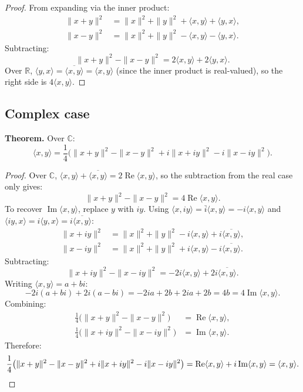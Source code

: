 \documentclass[12pt]{article}
\begin{document}
\begin{proof}
From expanding via the inner product:
\begin{align*}
\|x+y\|^2 &= \|x\|^2 + \|y\|^2 + \langle x,y\rangle + \langle y,x\rangle, \\
\|x-y\|^2 &= \|x\|^2 + \|y\|^2 - \langle x,y\rangle - \langle y,x\rangle.
\end{align*}
Subtracting:
\[
\|x+y\|^2 - \|x-y\|^2 = 2\langle x,y\rangle + 2\langle y,x\rangle.
\]
Over $\mathbb{R}$, $\langle y,x\rangle = \overline{\langle x,y\rangle} = \langle x,y\rangle$ (since the inner product is real-valued), so the right side is $4\langle x,y\rangle$.
\end{proof}

\subsection{Complex case}

\textbf{Theorem.} Over $\mathbb{C}$:
\[
\langle x,y\rangle = \frac{1}{4}\bigl(\|x+y\|^2 - \|x-y\|^2 + i\|x+iy\|^2 - i\|x-iy\|^2\bigr).
\]

\begin{proof}
Over $\mathbb{C}$, $\langle x,y\rangle + \overline{\langle x,y\rangle} = 2\operatorname{Re}\langle x,y\rangle$, so the subtraction from the real case only gives:
\[
\|x+y\|^2 - \|x-y\|^2 = 4\operatorname{Re}\langle x,y\rangle.
\]
To recover $\operatorname{Im}\langle x,y\rangle$, replace $y$ with $iy$. Using $\langle x, iy\rangle = \bar{i}\langle x,y\rangle = -i\langle x,y\rangle$ and $\langle iy, x\rangle = i\langle y,x\rangle = i\overline{\langle x,y\rangle}$:
\begin{align*}
\|x+iy\|^2 &= \|x\|^2 + \|y\|^2 - i\langle x,y\rangle + i\overline{\langle x,y\rangle}, \\
\|x-iy\|^2 &= \|x\|^2 + \|y\|^2 + i\langle x,y\rangle - i\overline{\langle x,y\rangle}.
\end{align*}
Subtracting:
\[
\|x+iy\|^2 - \|x-iy\|^2 = -2i\langle x,y\rangle + 2i\overline{\langle x,y\rangle}.
\]
Writing $\langle x,y\rangle = a+bi$:
\[
-2i(a+bi) + 2i(a-bi) = -2ia + 2b + 2ia + 2b = 4b = 4\operatorname{Im}\langle x,y\rangle.
\]
Combining:
\begin{align*}
\tfrac{1}{4}\bigl(\|x+y\|^2 - \|x-y\|^2\bigr) &= \operatorname{Re}\langle x,y\rangle, \\
\tfrac{1}{4}\bigl(\|x+iy\|^2 - \|x-iy\|^2\bigr) &= \operatorname{Im}\langle x,y\rangle.
\end{align*}
Therefore:
\[
\frac{1}{4}\bigl(\|x+y\|^2 - \|x-y\|^2 + i\|x+iy\|^2 - i\|x-iy\|^2\bigr) = \operatorname{Re}\langle x,y\rangle + i\operatorname{Im}\langle x,y\rangle = \langle x,y\rangle. \qedhere
\]
\end{proof}
\end{document}
